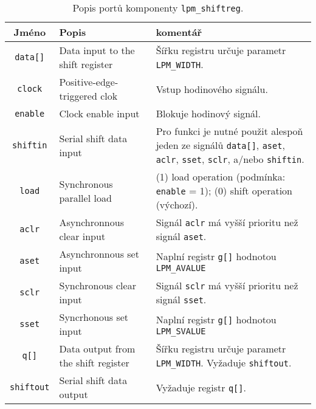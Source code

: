     \begin{table} 
      \begin{tabular}{|c|p{3.5cm}|p{8cm}|}
        \hline
           \rowcolor{CornflowerBlue} {\textbf{Jméno}}              & {\textbf{Popis}}          & {\textbf{komentář}} \\
        \hline\hline       
           \texttt{data[]}   & Data input to the shift register    & Šířku registru určuje parametr \texttt{LPM\_WIDTH}. \\
        \hline   
           \texttt{clock}    & Positive-edge-triggered clok        & Vstup hodinového signálu. \\
        \hline     
           \texttt{enable}   & Clock enable input                  & Blokuje hodinový signál. \\
        \hline      
           \texttt{shiftin}  & Serial shift data input             & Pro funkci je nutné použit alespoň jeden ze signálů
           \texttt{data[]}, \texttt{aset}, \texttt{aclr}, \texttt{sset}, \texttt{sclr}, a/nebo
                                                                  \texttt{shiftin}.  \\
        \hline    
           \texttt{load}     & Synchronous parallel load           & (1) load operation (podmínka: \texttt{enable} = 1); (0) shift
           operation (výchozí). \\
        \hline    
           \texttt{aclr}     & Asynchronnous clear input           & Signál \texttt{aclr} má vyšší prioritu než signál
           \texttt{aset}.  \\
        \hline    
           \texttt{aset}     & Asynchronnous set input             & Naplní registr \texttt{g[]} hodnotou \texttt{LPM\_AVALUE} \\
        \hline 
           \texttt{sclr}     & Synchronous clear input             & Signál \texttt{sclr} má vyšší prioritu než signál
           \texttt{sset}.  \\
        \hline  
           \texttt{sset}     & Syncrhonous set input               & Naplní registr \texttt{g[]} hodnotou \texttt{LPM\_SVALUE} \\
        \hline  
           \texttt{q[]}      & Data output from the shift register & Šířku registru určuje parametr \texttt{LPM\_WIDTH}. Vyžaduje
           \texttt{shiftout}.  \\
        \hline 
           \texttt{shiftout} & Serial shift data output            & Vyžaduje registr \texttt{q[]}. \\
        \hline                                                           
      \end{tabular}
      \caption{Popis portů komponenty \texttt{lpm\_shiftreg}.}
      \label{VHDL:tab_lpm_shiftreg}       
    \end{table}
    
    
